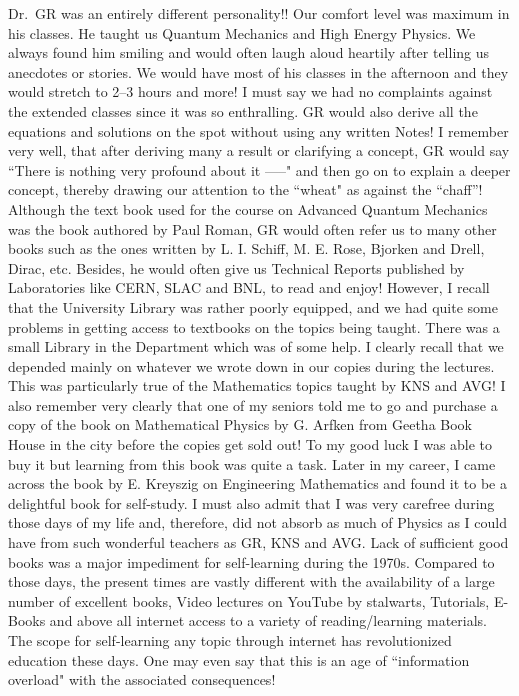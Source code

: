 Dr.\ GR was an entirely different personality!! Our comfort level was maximum in his classes. He taught us Quantum Mechanics and High Energy Physics. We always found him smiling and would often laugh aloud heartily after telling us anecdotes or stories. We would have most of his classes in the afternoon and they would stretch to 2--3 hours and more! I must say we had no complaints against the extended classes since it was so enthralling. GR would also derive all the equations and solutions on the spot without using any written Notes! I remember very well, that after deriving many a result or clarifying a concept, GR would say ``There is nothing very profound about it -----" and then go on to explain a deeper concept, thereby drawing our attention to the ``wheat" as against the  ``chaff”! Although the text book used for the course on Advanced Quantum Mechanics was the book authored by Paul Roman, GR would often refer us to many other books such as the ones written by L. I. Schiff, M. E. Rose, Bjorken and Drell, Dirac, etc. Besides, he would often give us Technical Reports published by Laboratories like CERN, SLAC and BNL, to read and enjoy! However, I recall that the University Library was rather poorly equipped, and we had quite some problems in getting access to textbooks on the topics being taught. There was a small Library in the Department which was of some help. I clearly recall that we depended mainly on whatever we wrote down in our copies during the lectures. This was particularly true of the Mathematics topics taught by KNS and AVG! I also remember very clearly that one of my seniors told me to go and purchase a copy of the book on Mathematical Physics by G. Arfken from Geetha Book House in the city before the copies get sold out! To my good luck I was able to buy it but learning from this book was quite a task. Later in my career, I came across the book by E. Kreyszig on Engineering Mathematics and found it to be a delightful book for self-study. I must also admit that I was very carefree during those days of my life and, therefore, did not absorb as much of Physics as I could have from such wonderful teachers as GR, KNS and AVG. Lack of sufficient good books was a major impediment for self-learning during the 1970s. Compared to those days, the present times are vastly different with the availability of a large number of excellent books, Video lectures on YouTube by stalwarts, Tutorials, E-Books and above all internet access to a variety of reading/learning materials. The scope for self-learning any topic through internet has revolutionized education these days. One may even say that this is an age of  ``information overload" with the associated consequences!     
\newpage

